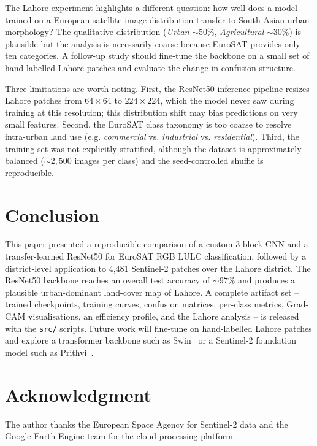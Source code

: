 \documentclass[conference]{IEEEtran}
\begin{document}
The Lahore experiment highlights a different question: how well does
a model trained on a European satellite-image distribution transfer
to South Asian urban morphology? The qualitative distribution
(\emph{Urban} $\sim 50\%$, \emph{Agricultural} $\sim 30\%$) is
plausible but the analysis is necessarily coarse because EuroSAT
provides only ten categories. A follow-up study should fine-tune
the backbone on a small set of hand-labelled Lahore patches and
evaluate the change in confusion structure.

Three limitations are worth noting. First, the ResNet50 inference
pipeline resizes Lahore patches from $64\times64$ to $224\times224$,
which the model never saw during training at this resolution; this
distribution shift may bias predictions on very small features.
Second, the EuroSAT class taxonomy is too coarse to resolve
intra-urban land use (e.g. \emph{commercial} vs. \emph{industrial}
vs. \emph{residential}). Third, the training set was not
explicitly stratified, although the dataset is approximately
balanced ($\sim 2{,}500$ images per class) and the seed-controlled
shuffle is reproducible.

\section{Conclusion}
\label{sec:conclusion}

This paper presented a reproducible comparison of a custom 3-block
CNN and a transfer-learned ResNet50 for EuroSAT RGB LULC
classification, followed by a district-level application to 4{,}481
Sentinel-2 patches over the Lahore district. The ResNet50 backbone
reaches an overall test accuracy of $\sim 97\%$ and produces a
plausible urban-dominant land-cover map of Lahore. A complete
artifact set -- trained checkpoints, training curves, confusion
matrices, per-class metrics, Grad-CAM visualisations, an efficiency
profile, and the Lahore analysis -- is released with the
\texttt{src/} scripts. Future work will fine-tune on hand-labelled
Lahore patches and explore a transformer backbone such as
Swin~\cite{liu2021swin} or a Sentinel-2 foundation model such as
Prithvi~\cite{jakubik2023prithvi}.

\section*{Acknowledgment}
The author thanks the European Space Agency for Sentinel-2 data
and the Google Earth Engine team for the cloud processing
platform.
\end{document}
